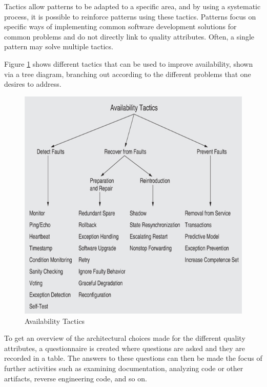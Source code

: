 Tactics allow patterns to be adapted to a specific area, and by using a systematic process, it is possible to reinforce patterns using these tactics.
Patterns focus on specific ways of implementing common software development solutions for common problems and do not directly link to quality attributes. Often, a single pattern may solve multiple tactics.

Figure \ref{fig:availability-tactics} shows different tactics that can be used to improve availability, shown via a tree diagram, branching out according to the different problems that one desires to address.

\begin{figure}[H]
    \centering
    \caption{Availability Tactics}
    \label{fig:availability-tactics}
    \includegraphics[width=0.7\linewidth]{report/GroupTemplate/images/Availability tactics.png}
\end{figure}

To get an overview of the architectural choices made for the different quality attributes, a questionnaire is created where questions are asked and they are recorded in a table. The answers to these questions can then be made the focus of further activities such as examining documentation, analyzing code or other artifacts, reverse engineering code, and so on.






